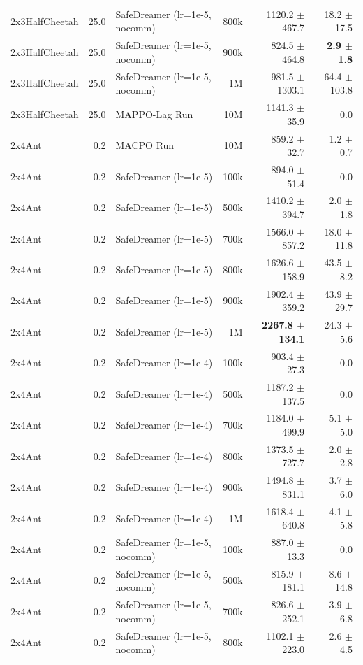 \documentclass{article}
\begin{document}
\begin{longtable}{l r l r r r}
2x3HalfCheetah & 25.0 & SafeDreamer (lr=1e-5, nocomm) & 800k & 1120.2 $\pm$ 467.7 & 18.2 $\pm$ 17.5 \\
2x3HalfCheetah & 25.0 & SafeDreamer (lr=1e-5, nocomm) & 900k & 824.5 $\pm$ 464.8 & \textbf{2.9 $\pm$ 1.8} \\
2x3HalfCheetah & 25.0 & SafeDreamer (lr=1e-5, nocomm) & 1M & 981.5 $\pm$ 1303.1 & 64.4 $\pm$ 103.8 \\
2x3HalfCheetah & 25.0 & MAPPO-Lag Run & 10M & 1141.3 $\pm$ 35.9 & 0.0 \\
\midrule
2x4Ant & 0.2 & MACPO Run & 10M & 859.2 $\pm$ 32.7 & 1.2 $\pm$ 0.7 \\
2x4Ant & 0.2 & SafeDreamer (lr=1e-5) & 100k & 894.0 $\pm$ 51.4 & 0.0 \\
2x4Ant & 0.2 & SafeDreamer (lr=1e-5) & 500k & 1410.2 $\pm$ 394.7 & 2.0 $\pm$ 1.8 \\
2x4Ant & 0.2 & SafeDreamer (lr=1e-5) & 700k & 1566.0 $\pm$ 857.2 & 18.0 $\pm$ 11.8 \\
2x4Ant & 0.2 & SafeDreamer (lr=1e-5) & 800k & 1626.6 $\pm$ 158.9 & 43.5 $\pm$ 8.2 \\
2x4Ant & 0.2 & SafeDreamer (lr=1e-5) & 900k & 1902.4 $\pm$ 359.2 & 43.9 $\pm$ 29.7 \\
2x4Ant & 0.2 & SafeDreamer (lr=1e-5) & 1M & \textbf{2267.8 $\pm$ 134.1} & 24.3 $\pm$ 5.6 \\
2x4Ant & 0.2 & SafeDreamer (lr=1e-4) & 100k & 903.4 $\pm$ 27.3 & 0.0 \\
2x4Ant & 0.2 & SafeDreamer (lr=1e-4) & 500k & 1187.2 $\pm$ 137.5 & 0.0 \\
2x4Ant & 0.2 & SafeDreamer (lr=1e-4) & 700k & 1184.0 $\pm$ 499.9 & 5.1 $\pm$ 5.0 \\
2x4Ant & 0.2 & SafeDreamer (lr=1e-4) & 800k & 1373.5 $\pm$ 727.7 & 2.0 $\pm$ 2.8 \\
2x4Ant & 0.2 & SafeDreamer (lr=1e-4) & 900k & 1494.8 $\pm$ 831.1 & 3.7 $\pm$ 6.0 \\
2x4Ant & 0.2 & SafeDreamer (lr=1e-4) & 1M & 1618.4 $\pm$ 640.8 & 4.1 $\pm$ 5.8 \\
2x4Ant & 0.2 & SafeDreamer (lr=1e-5, nocomm) & 100k & 887.0 $\pm$ 13.3 & 0.0 \\
2x4Ant & 0.2 & SafeDreamer (lr=1e-5, nocomm) & 500k & 815.9 $\pm$ 181.1 & 8.6 $\pm$ 14.8 \\
2x4Ant & 0.2 & SafeDreamer (lr=1e-5, nocomm) & 700k & 826.6 $\pm$ 252.1 & 3.9 $\pm$ 6.8 \\
2x4Ant & 0.2 & SafeDreamer (lr=1e-5, nocomm) & 800k & 1102.1 $\pm$ 223.0 & 2.6 $\pm$ 4.5 \\

\end{longtable}
\end{document}

